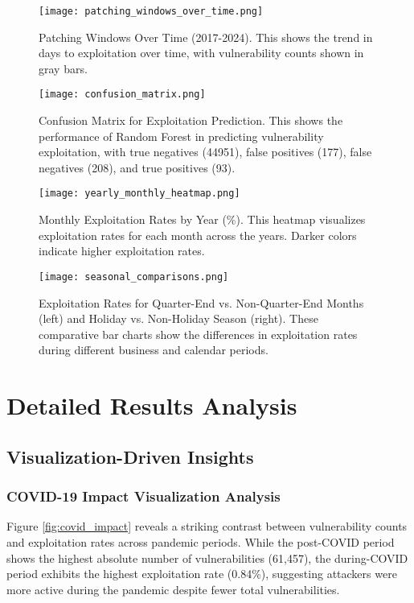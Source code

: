\documentclass[runningheads]{llncs}
\begin{document}
\begin{figure}[htbp]
    \texttt{[image: patching\_windows\_over\_time.png]}
    \caption{Patching Windows Over Time (2017-2024). This shows the trend in days to exploitation over time, with vulnerability counts shown in gray bars.}
    \label{fig:patching_windows}
\end{figure}

\begin{figure}[H]
    \texttt{[image: confusion\_matrix.png]}
    \caption{Confusion Matrix for Exploitation Prediction. This shows the performance of Random Forest in predicting vulnerability exploitation, with true negatives (44951), false positives (177), false negatives (208), and true positives (93).}
    \label{fig:confusion_matrix}
\end{figure}

\begin{figure}[H]
    \texttt{[image: yearly\_monthly\_heatmap.png]}
    \caption{Monthly Exploitation Rates by Year (\%). This heatmap visualizes exploitation rates for each month across the years. Darker colors indicate higher exploitation rates.}
    \label{fig:monthly_exploitation}
\end{figure}

\begin{figure}[H]
    \texttt{[image: seasonal\_comparisons.png]}
    \caption{Exploitation Rates for Quarter-End vs. Non-Quarter-End Months (left) and Holiday vs. Non-Holiday Season (right). These comparative bar charts show the differences in exploitation rates during different business and calendar periods.}
    \label{fig:seasonal_comparison}
\end{figure}

\section{Detailed Results Analysis}
\label{sec:detailed_results}

\subsection{Visualization-Driven Insights}

\subsubsection{COVID-19 Impact Visualization Analysis}
Figure \ref{fig:covid_impact} reveals a striking contrast between vulnerability counts and exploitation rates across pandemic periods. While the post-COVID period shows the highest absolute number of vulnerabilities (61,457), the during-COVID period exhibits the highest exploitation rate (0.84\%), suggesting attackers were more active during the pandemic despite fewer total vulnerabilities.
\end{document}
